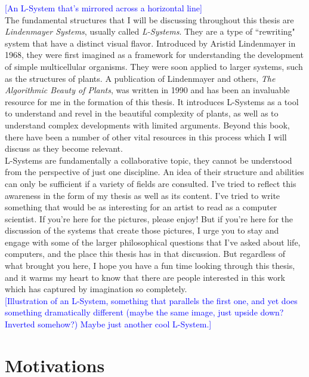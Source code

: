 \documentclass[12pt,twoside]{reedthesis}
\begin{document}
\textcolor{blue}{[An L-System that's mirrored across a horizontal line]}\\

The fundamental structures that I will be discussing throughout this thesis are \textit{Lindenmayer Systems}, usually called \textit{L-Systems}. They are a type of ``rewriting" system that have a distinct visual flavor. Introduced by Aristid Lindenmayer in 1968, they were first imagined as a framework for understanding the development of simple multicellular organisms. They were soon applied to larger systems, such as the structures of plants. A publication of Lindenmayer and others, \textit{The Algorithmic Beauty of Plants}, was written in 1990 and has been an invaluable resource for me in the formation of this thesis. It introduces L-Systems as a tool to understand and revel in the beautiful complexity of plants, as well as to understand complex developments with limited arguments. Beyond this book, there have been a number of other vital resources in this process which I will discuss as they become relevant.\\

L-Systems are fundamentally a collaborative topic, they cannot be understood from the perspective of just one discipline. An idea of their structure and abilities can only be sufficient if a variety of fields are consulted. I've tried to reflect this awareness in the form of my thesis as well as its content. I've tried to write something that would be as interesting for an artist to read as a computer scientist. If you're here for the pictures, please enjoy! But if you're here for the discussion of the systems that create those pictures, I urge you to stay and engage with some of the larger philosophical questions that I've asked about life, computers, and the place this thesis has in that discussion. But regardless of what brought you here, I hope you have a fun time looking through this thesis, and it warms my heart to know that there are people interested in this work which has captured by imagination so completely.\\


\textcolor{blue}{[Illustration of an L-System, something that parallels the first one, and yet does something dramatically different (maybe the same image, just upside down? Inverted somehow?) Maybe just another cool L-System.]}


\section{Motivations}
\end{document}
